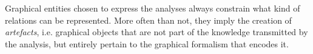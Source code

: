 \documentclass[english,output=paper,colorlinks,citecolor=brown]{../langscibook}
\begin{document}
Graphical entities chosen to express the analyses always constrain what kind of relations can be represented. More often than not, they imply the creation of \textit{artefacts}, i.e. graphical objects that are not part of the knowledge transmitted by the analysis, but entirely pertain to the graphical formalism that encodes it.


{\sloppy\printbibliography[heading=subbibliography,notkeyword=this]}
\end{document}
